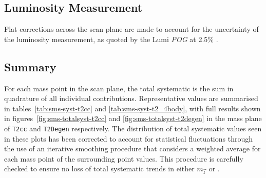 \subsection{Luminosity Measurement}
Flat corrections across the scan plane are made to account for the uncertainty 
of the luminosity measurement, as quoted by the Lumi \emph{POG} at 2.5\%
\cite{CMS:2013gfa}.

\subsection{Summary}

For each mass point in the scan plane, the total systematic is the sum in 
quadrature of all individual contributions. Representative values are summarised
in tables~\ref{tab:sms-syst-t2cc} and \ref{tab:sms-syst-t2_4body}, with full
results shown in figures~\ref{fig:sms-totalsyst-t2cc} and
\ref{fig:sms-totalsyst-t2degen} in the mass plane of \texttt{T2cc} and
\texttt{T2Degen} respectively. The distribution of total systematic values seen
in these plots has been corrected to account for statistical fluctuations through
the use of an iterative smoothing procedure that considers a weighted average
for each mass point of the surrounding point values. This procedure is
carefully checked to ensure no loss of total systematic trends in either $m_
{\widetilde{t}}$ or \deltam.

